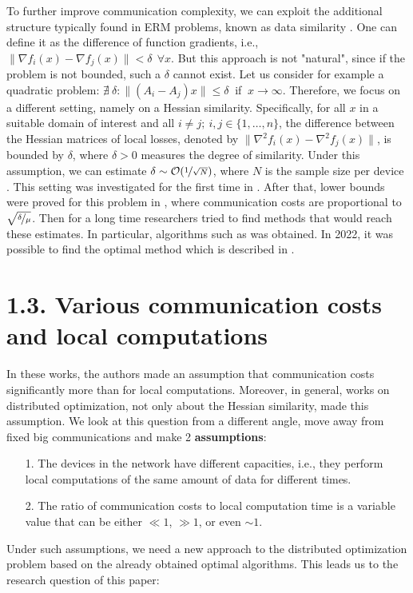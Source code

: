 \documentclass{article}
\theoremstyle{definition}
\theoremstyle{plain}
\begin{document}
To further improve communication complexity, we can exploit the additional structure typically found in ERM problems, known as data similarity \cite{arjevani2015communication, shamir2014communication, matsushima2014distributed}. One can define it as the difference of function gradients, i.e., $\|\nabla f_i (x) - \nabla f_j (x)\| < \delta ~~  \forall x$. But this approach is not "natural", since if the problem is not bounded, such a $\delta$ cannot exist. Let us consider for example a quadratic problem: $\nexists~ \delta: \|(A_i - A_j)x\| \leq \delta~$  if $~ x\rightarrow \infty$. Therefore, we focus on a different setting, namely on a Hessian similarity. Specifically, for all $x$ in a suitable domain of interest and all $i \neq j; ~ i,j \in \{1,\ldots,n\}$, the difference between the Hessian matrices of local losses, denoted by $\|\nabla ^2 f_i(x) - \nabla ^2 f_j(x)\|$, is bounded by $\delta$, where $\delta > 0$ measures the degree of similarity. Under this assumption, we can estimate $\delta \sim \mathcal O(\nicefrac{1}{\sqrt{N}})$, where $N$ is the sample size per device \cite{arjevani2015communication}. This setting was investigated for the first time in \cite{shamir2014communication}. After that, lower bounds were proved for this problem in \cite{arjevani2015communication}, where communication costs are proportional to $\sqrt{\nicefrac{\delta}{\mu}}$. Then for a long time researchers tried to find methods that would reach these estimates. In particular, algorithms such as \cite{tian2022acceleration, sun2022distributed, reddi2016aide, hendrikx2020statistically, beznosikov2021distributed} was obtained. In 2022, it was possible to find the optimal method which is described in \cite{kovalev2022optimal}. 

\section*{1.3. Various communication costs and local computations} \label{eq:1.3}

In these works, the authors made an assumption that communication costs significantly more than for local computations. Moreover, in general, works on distributed optimization, not only about the Hessian similarity, made this assumption. We look at this question from a different angle, move away from fixed big communications and make 2 \textbf{assumptions}:
\begin{itemize}
    \item [1.] The devices in the network have different capacities, i.e., they perform local computations of the same amount of data for different times.
    \item [2.] The ratio of communication costs to local computation time is a variable value that can be either $\ll 1$, $\gg1$, or even $\sim 1$.
\end{itemize}
Under such assumptions, we need a new approach to the distributed optimization problem based on the already obtained optimal algorithms. This leads us to the research question of this paper:
\end{document}
